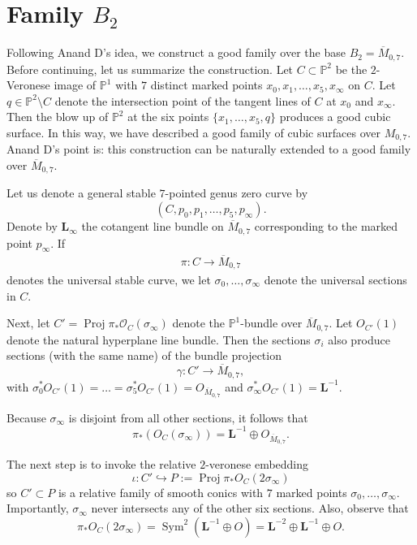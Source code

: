 \documentclass[12 pt]{amsart}
\renewcommand{\P}{\mathbb{P}}
\newcommand{\<}{\left\langle}
\renewcommand{\>}{\right\rangle}
\DeclareMathOperator{\proj}{Proj}
\DeclareMathOperator{\sym}{Sym}
\newcommand{\M}{\overline{M}_{0,7}}
\begin{document}
\section{Family $B_2$}
\label{sec:family-b_2}


Following Anand D's idea, we construct a good family over the base
$B_2 = \overline{M}_{0,7}$. Before continuing, let us summarize the
construction. Let $C \subset \P^{2}$ be the $2$-Veronese image of
$\P^{1}$ with $7$ distinct marked points
$x_{0}, x_{1}, \dots, x_{5}, x_{\infty}$ on $C$. Let
$q \in \P^{2} \setminus C$ denote the intersection point of the
tangent lines of $C$ at $x_{0}$ and $x_{\infty}$.  Then the blow up of
$\P^{2}$ at the six points $\{x_{1}, \dots, x_{5}, q\}$ produces a
good cubic surface.  In this way, we have described a good family of
cubic surfaces over $M_{0,7}$.  Anand D's point is: this construction
can be naturally extended to a good family over $\M$.




Let us denote a general stable
$7$-pointed genus zero curve by
$$(C, p_{0}, p_{1}, \dots, p_{5}, p_{\infty}).$$  Denote
by $\mathbf{L}_{\infty}$ the cotangent line bundle on $\M$
corresponding to the marked point $p_{\infty}$. If
\begin{align}
  \label{eq:PM07}
  \pi: C \to \overline{M}_{0,7}
\end{align}
denotes the universal stable curve, we let
$\sigma_{0}, \dots, \sigma_{\infty}$ denote the universal sections in
$C$.

Next, let $C' = \proj \pi_{*}\mathcal{O}_{C}(\sigma_{\infty})$ denote
the $\P^{1}$-bundle over $\overline{M}_{0,7}$. Let $O_{C'}(1)$ denote
the natural hyperplane line bundle.  Then the sections $\sigma_{i}$
also produce sections (with the same name) of the bundle projection
$$\gamma : C' \to \M,$$ with
$\sigma_{0}^{*}O_{C'}(1) = \dots = \sigma_{5}^{*}O_{C'}(1) = O_{\M}$
and $\sigma_{\infty}^{*}O_{C'}(1) = \mathbf{L}^{-1}$.

Because $\sigma_{\infty}$ is disjoint from all other sections, it
follows that
$$\pi_{*}(O_{C}(\sigma_{\infty})) = \mathbf{L}^{-1} \oplus O_{\M}.$$


The next step is to invoke the relative $2$-veronese
embedding
$$\iota: C' \hookrightarrow P := \proj
\pi_{*}O_{C}(2\sigma_{\infty})$$ so $C' \subset P$ is a relative
family of smooth conics with $7$ marked points
$\sigma_{0}, \dots, \sigma_{\infty}$.  Importantly, $\sigma_{\infty}$
never intersects any of the other six sections.  Also, observe that
$$\pi_{*}O_{C}(2 \sigma_{\infty}) = \sym^{2}(\mathbf{L}^{-1} \oplus
O) = \mathbf{L}^{-2} \oplus \mathbf{L}^{-1} \oplus O.$$
\end{document}
